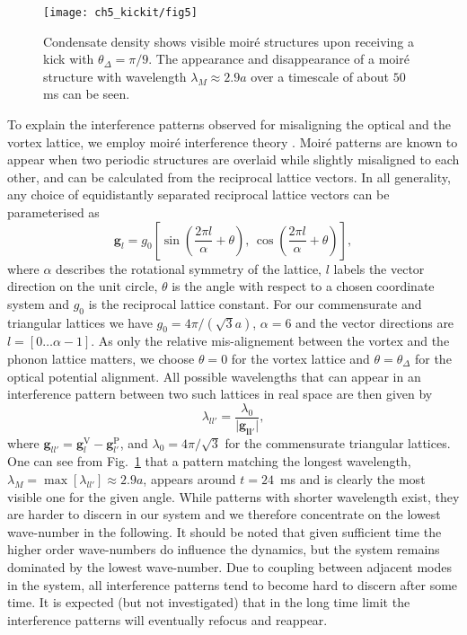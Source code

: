 	\begin{figure}[bt]
        \centering
		\texttt{[image: ch5\_kickit/fig5]}
		\caption[Oscillation of moir\'e wavelength.]{Condensate density shows visible moir\'e structures upon receiving a kick with $\theta_\Delta=\pi/9$. The appearance and disappearance of a moir\'e structure with wavelength $\lambda_M \approx 2.9 a$ over a timescale of about $50$ ms can be seen.}
		\label{fig:dtheta20_ev}
	\end{figure}

    To explain the interference patterns observed for misaligning the optical and the vortex lattice, we employ moir\'e interference theory \cite{SS:Hermann_jpcm_2012}. Moir\'e patterns are known to appear when two periodic structures are overlaid while slightly misaligned to each other, and can be calculated from the reciprocal lattice vectors. In all generality, any choice of equidistantly separated reciprocal lattice vectors can be parameterised as
    	\begin{equation}
    		\mathbf{g}_{l} = g_0 \left[ \sin\left( \frac{2\pi l}{\alpha}+\theta \right),\, \cos\left( \frac{2\pi l}{\alpha} +\theta\right) \right],
    	\end{equation}
    where $\alpha$ describes the rotational symmetry of the lattice, $l$ labels the vector direction on the unit circle, $\theta$ is the angle with respect to a chosen coordinate system and $g_0$ is the reciprocal lattice constant. For our commensurate and triangular lattices we have $g_0=4\pi/(\sqrt{3}a)$, $\alpha=6$ and the vector directions are $l=\left[0\dots\alpha-1\right]$. As only the relative mis-alignement between the vortex and the phonon lattice matters, we choose $\theta=0$ for the vortex lattice and $\theta=\theta_\Delta$ for the optical potential alignment.
    All possible wavelengths that can appear in an interference pattern between two such lattices in real space are then given by
    	\begin{equation}
    		\lambda_{ll'} = \frac{\lambda_0}{|\mathbf{\mathbf{g}_{ll'}|}},
    		\label{eq:InterferenceVectors}
    	\end{equation}
    where
    $\mathbf{g}_{ll'}=\mathbf{g}_{l}^{\text{V}}-\mathbf{g}_{l'}^{\text{P}}$, and
    $\lambda_0 = 4\pi/\sqrt{3}$ for the commensurate triangular lattices.
    One can see from Fig.~\ref{fig:dtheta20_ev} that a pattern matching the longest wavelength, $\lambda_M= \max[\lambda_{ll'}] \approx 2.9 a$, appears around $t=24$~ms and is clearly the most visible one for the given angle. While patterns with shorter wavelength exist, they are harder to discern in our system and we therefore concentrate on the lowest wave-number in the following. It should be noted that given sufficient time the higher order wave-numbers do influence the dynamics, but the system remains dominated by the lowest wave-number. Due to coupling between adjacent modes in the system, all interference patterns tend to become hard to discern after some time. It is expected (but not investigated) that in the long time limit the interference patterns will eventually refocus and reappear.

